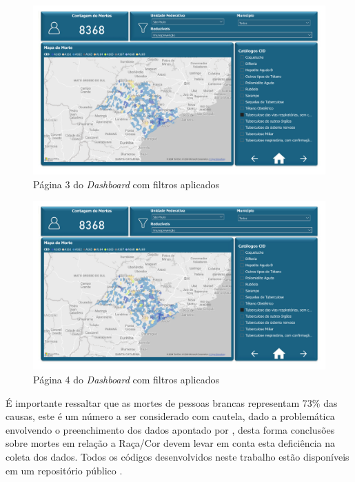 \begin{figure}[H]
	\caption{\label{fig_dash_3}Página 3 do \textit{Dashboard} com filtros aplicados}
	\begin{center}
		\includegraphics[width=\textwidth, page = 3]{USPSC-img/dash}
	\end{center}
\end{figure}

\begin{figure}[H]
	\caption{\label{fig_dash_4}Página 4 do \textit{Dashboard} com filtros aplicados}
	\begin{center}
		\includegraphics[width=\textwidth, page = 4]{USPSC-img/dash}
	\end{center}
\end{figure}

É importante ressaltar que as mortes de pessoas brancas representam 73\% das causas, este é um número a ser considerado com cautela, dado a problemática envolvendo o preenchimento dos dados apontado por , desta forma conclusões sobre mortes em relação a Raça/Cor devem levar em conta esta deficiência na coleta dos dados. Todos os códigos desenvolvidos neste trabalho estão disponíveis em um repositório público \cite{lucas_barbosa_defanti_2024_12190066}.


